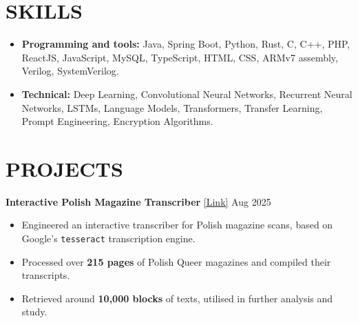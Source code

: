\documentclass[a4paper]{extarticle}
\begin{document}

\section*{SKILLS}
\begin{itemize}
  \item \textbf{Programming and tools:} Java, Spring Boot, Python,
    Rust, C, C++, PHP, ReactJS, JavaScript, MySQL, TypeScript, HTML,
    CSS, ARMv7 assembly, Verilog, SystemVerilog.
  \item \textbf{Technical:} Deep Learning, Convolutional Neural
    Networks, Recurrent Neural Networks, LSTMs, Language Models,
    Transformers, Transfer Learning, Prompt Engineering, Encryption Algorithms.
\end{itemize}

\section*{PROJECTS}
\noindent
\textbf{Interactive Polish Magazine Transcriber}
\href{https://github.com/manojmanikandan7/PolishMagTextRecog}{[Link]}
\hfill Aug 2025 %
\begin{itemize}
  \item Engineered an interactive transcriber for Polish magazine
    scans, based on Google's \texttt{tesseract} transcription engine.
  \item Processed over \textbf{215 pages} of Polish Queer magazines
    and compiled their transcripts.
  \item Retrieved around \textbf{10,000 blocks} of texts, utilised in
    further analysis and study.
\end{itemize}
\end{document}
